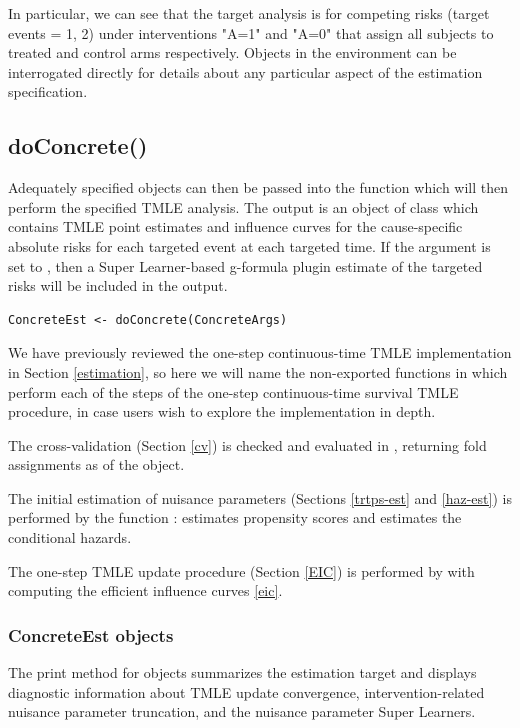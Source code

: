 \documentclass{report}
\newcommand{\1}{\ensuremath{\mathbf{1}}}
\begin{document}
In particular, we can see that the target analysis is for competing risks (target events = 1, 2) under interventions "A=1" and "A=0" that assign all subjects to treated and control arms respectively. Objects in the  environment can be interrogated directly for details about any particular aspect of the estimation specification.

\subsection{doConcrete()}
\label{doConcrete}
Adequately specified  objects can then be passed into the  function which will then perform the specified TMLE analysis. The output is an object of class  which contains TMLE point estimates and influence curves for the cause-specific absolute risks for each targeted event at each targeted time. If the  argument is set to , then a Super Learner-based g-formula plugin estimate of the targeted risks will be included in the output. 

\begin{lstlisting}
ConcreteEst <- doConcrete(ConcreteArgs)
\end{lstlisting}

We have previously reviewed the one-step continuous-time TMLE implementation in Section \ref{estimation}, so here we will name the non-exported functions in  which perform each of the steps of the one-step continuous-time survival TMLE procedure, in case users wish to explore the implementation in depth.

The cross-validation (Section \ref{cv}) is checked and evaluated in , returning fold assignments as  of the  object.

The initial estimation of nuisance parameters (Sections \ref{trtps-est} and \ref{haz-est}) is performed by the function :  estimates propensity scores and  estimates the conditional hazards.

The one-step TMLE update procedure (Section \ref{EIC}) is performed by  with  computing the efficient influence curves \eqref{eic}.

\subsubsection{ConcreteEst objects}
\label{concreteest}
The print method for  objects summarizes the estimation target and displays diagnostic information about TMLE update convergence, intervention-related nuisance parameter truncation, and the nuisance parameter Super Learners.
\end{document}
